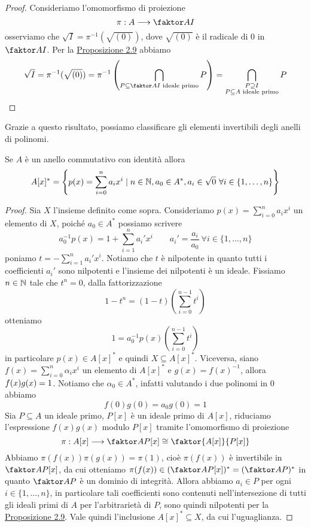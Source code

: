 \documentclass[11pt]{scrartcl}
\begin{document}
\begin{proof}
    Consideriamo l'omomorfismo di proiezione
    \[
        \pi: A\longrightarrow \faktor A I
    \]
    osserviamo che $\sqrt{I} = \pi^{-1}(\sqrt{(0)})$, dove $\sqrt{(0)}$ è il radicale di 
    $0$ in $\faktor A I$. Per la \hyperref[prop2.9]{Proposizione 2.9}
    abbiamo
    \[
        \sqrt{I} = \pi^{-1}(\sqrt{(0)}) = \pi^{-1}\left(
            \bigcap_{P \subseteq \faktor A I\text{ ideale primo}} P\right) = 
            \bigcap_{\substack{P\supseteq I\\P \subseteq A\text{ ideale primo}}}P
    \]
\end{proof}

\newpage

Grazie a questo risultato, possiamo classificare gli elementi invertibili 
degli anelli di polinomi.

\begin{proposition}
    Se $A$ è un anello commutativo con identità allora 
    \[
        A[x]^* = \left\{p(x) = \sum_{i = 0}^n a_ix^i\mid n \in \mathbb N,
        a_0 \in A^*, a_i \in \sqrt{0}~\forall i \in \{1, \ldots, n\}\right\}
    \]
\end{proposition}

\begin{proof}
    Sia $X$ l'insieme definito come sopra. Consideriamo 
    $p(x) = \displaystyle\sum_{i = 0}^n a_i x^i$ un elemento di $X$, poiché
    $a_0 \in A^*$ possiamo scrivere 
    \[
        a_0^{-1}p(x) = 1 + \sum_{i = 1}^n a_i'x^i \qquad 
        a_i' = \frac{a_i}{a_0}~\forall i \in \{1, \ldots,n\}
    \]
    poniamo $t = \displaystyle -\sum_{i = 1}^n a_i'x^i$. Notiamo che $t$ è
    nilpotente in quanto tutti i coefficienti $a_i'$ sono nilpotenti e l'insieme
    dei nilpotenti è un ideale. Fissiamo $n \in \mathbb N$ tale che $t^n = 0$, 
    dalla fattorizzazione 
    \[
        1 - t^n = (1 - t)\left(\sum_{i = 0}^{n - 1}t^i\right)
    \]
    otteniamo 
    \[
        1 = a_0^{-1}p(x)\left(\sum_{i = 0}^{n - 1}t^i\right)
    \]
    in particolare $p(x) \in A[x]^*$ e quindi $X \subseteq A[x]^*$.\newline
    Viceversa, siano $f(x) = \displaystyle\sum_{i = 0}^n\alpha_ix^i$ un 
    elemento di $A[x]^*$ e $g(x) = f(x)^{-1}$, allora $f(x)g(x) = \nolinebreak 1$.
    Notiamo che $\alpha_0 \in A^*$, infatti valutando i due polinomi in 0
    abbiamo
    \[
        f(0)g(0) = a_0g(0) = 1
    \]
    Sia $P \subseteq A$ un ideale primo, $P[x]$ è un ideale primo di $A[x]$,
    riduciamo l'espressione $f(x)g(x)$ modulo $P[x]$ tramite l'omomorfismo 
    di proiezione
    \[
        \pi: A[x]\longrightarrow \faktor A P [x] \cong \faktor{A[x]}{P[x]}
    \]
    Abbiamo $\pi(f(x))\pi(g(x)) = \pi(1)$, cioè $\pi(f(x))$ è invertibile in 
    $\faktor A P [x]$, da cui otteniamo $\pi(f(x)) \in (\faktor A P [x])^* = (\faktor A P)^*$ in quanto $\faktor A P$
    è un dominio di integrità. Allora abbiamo $a_i \in P$ per ogni $i \in \{1, \ldots, n\}$,
    in particolare tali coefficienti sono contenuti nell'intersezione di tutti
    gli ideali primi di $A$ per l'arbitrarietà di $P$, sono quindi nilpotenti
    per la \hyperref[prop2.9]{Proposizione 2.9}. Vale quindi l'inclusione 
    $A[x]^* \subseteq X$, da cui l'uguaglianza.
\end{proof}
\end{document}
